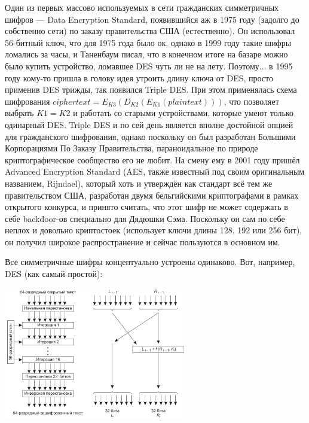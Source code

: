 \documentclass{../../text-style}
\begin{document}
Один из первых массово используемых в сети гражданских симметричных шифров --- Data Encryption Standard, появившийся аж в 1975 году (задолго до собственно сети) по заказу правительства США (естественно). Он использовал 56-битный ключ, что для 1975 года было ок, однако в 1999 году такие шифры ломались за часы, и Таненбаум писал, что в конечном итоге на базаре можно было купить устройство, ломавшее DES чуть ли не на лету. Поэтому... в 1995 году кому-то пришла в голову идея утроить длину ключа от DES, просто применив DES трижды, так появился Triple DES. При этом применялась схема шифрования $ciphertext = E_{K3}(D_{K2}(E_{K1}(plaintext)))$, что позволяет выбрать $K1 = K2$ и работать со старыми устройствами, которые умеют только одинарный DES. Triple DES и по сей день является вполне достойной опцией для гражданского шифрования, однако поскольку он был разработан Большими Корпорациями По Заказу Правительства, параноидальное по природе криптографическое сообщество его не любит. На смену ему в 2001 году пришёл Advanced Encryption Standard (AES, также известный под своим оригинальным названием, Rijndael), который хоть и утверждён как стандарт всё тем же правительством США, разработан двумя бельгийскими криптографами в рамках открытого конкурса, и принято считать, что этот шифр не может содержать в себе backdoor-ов специально для Дядюшки Сэма. Поскольку он сам по себе неплох и довольно криптостоек (использует ключи длины 128, 192 или 256 бит), он получил широкое распространение и сейчас пользуются в основном им.

Все симметричные шифры концептуально устроены одинаково. Вот, например, DES (как самый простой):

\begin{center}
    \includegraphics[width=0.6\textwidth]{des.png}
\end{center}
\end{document}
